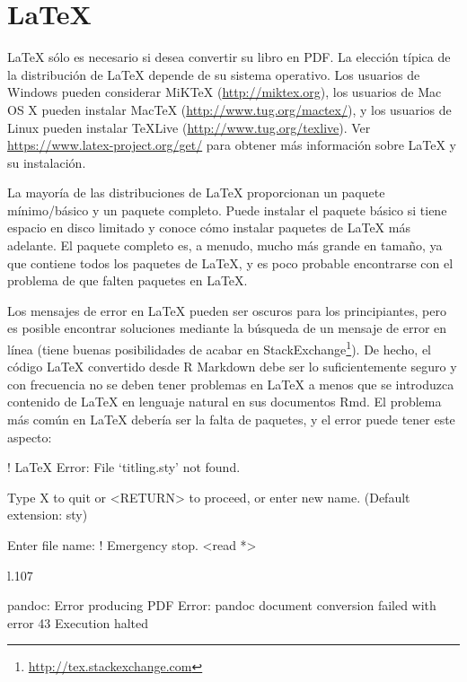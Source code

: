 \documentclass[12pt,]{krantz}
\makeatletter
\newenvironment{Shaded}{\begin{snugshade}}{\end{snugshade}}
\newcommand{\NormalTok}[1]{#1}
\renewcommand{\href}[2]{#2\footnote{\url{#1}}}
\newenvironment{kframe}{%
\medskip{}
\setlength{\fboxsep}{.8em}
 \def\at@end@of@kframe{}%
 \ifinner\ifhmode%
  \def\at@end@of@kframe{\end{minipage}}%
  \begin{minipage}{\columnwidth}%
 \fi\fi%
 \def\FrameCommand##1{\hskip\@totalleftmargin \hskip-\fboxsep
 \colorbox{shadecolor}{##1}\hskip-\fboxsep
     \hskip-\linewidth \hskip-\@totalleftmargin \hskip\columnwidth}%
 \MakeFramed {\advance\hsize-\width
   \@totalleftmargin\z@ \linewidth\hsize
   \@setminipage}}%
 {\par\unskip\endMakeFramed%
 \at@end@of@kframe}
\renewenvironment{Shaded}{\begin{kframe}}{\end{kframe}}
\theoremstyle{definition}
\theoremstyle{definition}
\theoremstyle{definition}
\theoremstyle{remark}
\makeatother
\begin{document}
\section{LaTeX}\label{latex}

LaTeX sólo es necesario si desea convertir su libro en PDF.
La elección típica de la distribución de LaTeX depende de su sistema
operativo. Los usuarios de Windows pueden considerar MiKTeX
(\url{http://miktex.org}), los usuarios de Mac OS X pueden instalar
MacTeX (\url{http://www.tug.org/mactex/}), y los usuarios de Linux
pueden instalar TeXLive (\url{http://www.tug.org/texlive}). Ver
\url{https://www.latex-project.org/get/} para obtener más información
sobre LaTeX y su instalación.

La mayoría de las distribuciones de LaTeX proporcionan un paquete
mínimo/básico y un paquete completo. Puede instalar el paquete básico si
tiene espacio en disco limitado y conoce cómo instalar paquetes de LaTeX
más adelante. El paquete completo es, a menudo, mucho más grande en
tamaño, ya que contiene todos los paquetes de LaTeX, y es poco probable
encontrarse con el problema de que falten paquetes en LaTeX.

Los mensajes de error en LaTeX pueden ser oscuros para los
principiantes, pero es posible encontrar soluciones mediante la búsqueda
de un mensaje de error en línea (tiene buenas posibilidades de acabar en
\href{http://tex.stackexchange.com}{StackExchange}). De hecho, el código
LaTeX convertido desde R Markdown debe ser lo suficientemente seguro y
con frecuencia no se deben tener problemas en LaTeX a menos que se
introduzca contenido de LaTeX en lenguaje natural en sus documentos Rmd.
El problema más común en LaTeX debería ser la falta de paquetes, y el
error puede tener este aspecto:

\begin{Shaded}
\begin{Highlighting}[]
\NormalTok{! LaTeX Error: File `titling.sty' not found.}

\NormalTok{Type X to quit or <RETURN> to proceed,}
\NormalTok{or enter new name. (Default extension: sty)}

\NormalTok{Enter file name: }
\NormalTok{! Emergency stop.}
\NormalTok{<read *> }
         
\NormalTok{l.107 ^^M}

\NormalTok{pandoc: Error producing PDF}
\NormalTok{Error: pandoc document conversion failed with error 43}
\NormalTok{Execution halted}
\end{Highlighting}
\end{Shaded}
\end{document}
